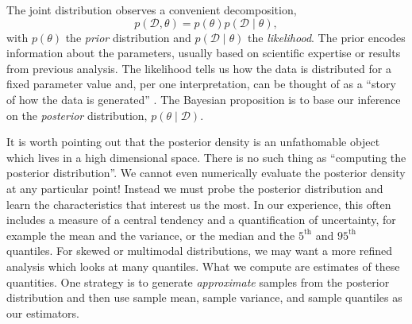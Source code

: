 The joint distribution observes a convenient decomposition,
\begin{equation*}
  p(\mathcal D, \theta) = p(\theta) p(\mathcal D \mid \theta),
\end{equation*}
%
with $p(\theta)$ the \textit{prior} distribution and $p(\mathcal D \mid \theta)$ the \textit{likelihood}.
The prior encodes information about the parameters, usually based on scientific expertise or results from previous analysis.
The likelihood tells us how the data is distributed for a fixed parameter value and, per one interpretation, can be thought of as a ``story of how the data is generated'' \cite{Gelman:2013b}.
%
The Bayesian proposition is to base our inference on the \textit{posterior} distribution, $p(\theta \mid \mathcal D)$.


It is worth pointing out that the posterior density is an unfathomable object which lives in a high dimensional space.
There is no such thing as ``computing the posterior distribution''.
We cannot even numerically evaluate the posterior density at any particular point!
Instead we must probe the posterior distribution and learn the characteristics that interest us the most.
In our experience, this often includes a measure of a central tendency and a quantification of uncertainty, for example the mean and the variance, or the median and the $5^\mathrm{th}$ and $95^\mathrm{th}$ quantiles.
For skewed or multimodal distributions, we may want a more refined analysis which looks at many quantiles.
What we compute are estimates of these quantities.
One strategy is to generate \textit{approximate} samples from the posterior distribution and then use sample mean, sample variance, and sample quantiles as our estimators.

